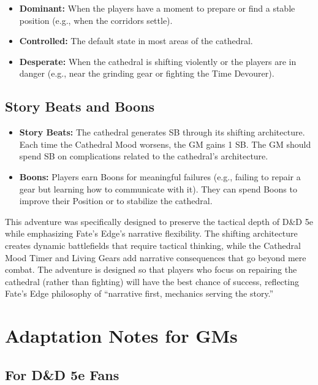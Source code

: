 \documentclass{article}
\begin{document}
\begin{itemize}
    \item \textbf{Dominant:} When the players have a moment to prepare or find a stable position (e.g., when the corridors settle).
    \item \textbf{Controlled:} The default state in most areas of the cathedral.
    \item \textbf{Desperate:} When the cathedral is shifting violently or the players are in danger (e.g., near the grinding gear or fighting the Time Devourer).
\end{itemize}

\subsection{Story Beats and Boons}

\begin{itemize}
    \item \textbf{Story Beats:} The cathedral generates SB through its shifting architecture. Each time the Cathedral Mood worsens, the GM gains 1 SB. The GM should spend SB on complications related to the cathedral's architecture.
    \item \textbf{Boons:} Players earn Boons for meaningful failures (e.g., failing to repair a gear but learning how to communicate with it). They can spend Boons to improve their Position or to stabilize the cathedral.
\end{itemize}

\begin{tcolorbox}[colback=blue!5,colframe=blue!50!black,title=Design Note,breakable]
This adventure was specifically designed to preserve the tactical depth of D\&D 5e while emphasizing Fate's Edge's narrative flexibility. The shifting architecture creates dynamic battlefields that require tactical thinking, while the Cathedral Mood Timer and Living Gears add narrative consequences that go beyond mere combat. The adventure is designed so that players who focus on repairing the cathedral (rather than fighting) will have the best chance of success, reflecting Fate's Edge philosophy of ``narrative first, mechanics serving the story.''
\end{tcolorbox}

\section{Adaptation Notes for GMs}

\subsection{For D\&D 5e Fans}
\end{document}
